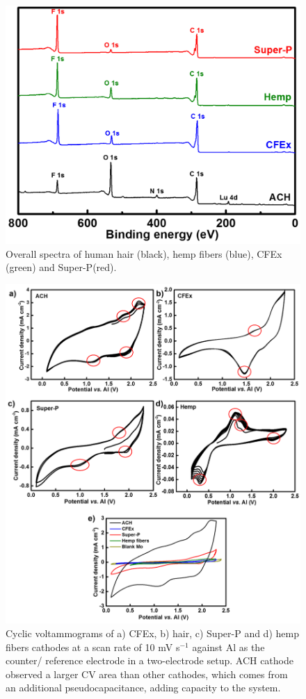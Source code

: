 \begin{figure}[h!]
\centering
\includegraphics[width=\textwidth]{Figures/chap5fig/XPSoverall}
\caption{Overall spectra of human hair (black), hemp fibers (blue), CFEx (green) and Super-P(red).}
\label{Figures/chap5fig:XPSoverall}
\end{figure}

 \begin{figure}[h!]
  \centering
  \includegraphics[width=\textwidth]{Figures/chap5fig/CV}
    \caption{Cyclic voltammograms of a) CFEx, b) hair, c) Super-P and d) hemp fibers cathodes at a scan rate of 10 mV s$^{-1}$ against Al as the counter/ reference electrode in a two-electrode setup. ACH cathode observed a larger CV area than other cathodes, which comes from an additional pseudocapacitance, adding capacity to the system.}
  \label{Figures/chap5fig:CV}
\end{figure}


